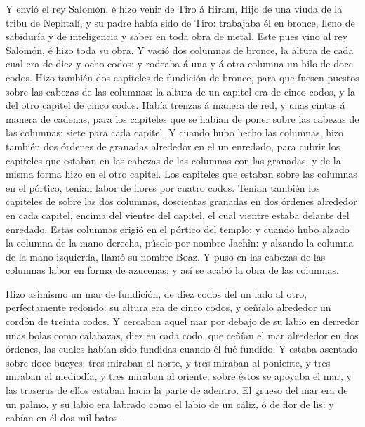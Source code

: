  Y envió el rey Salomón, é hizo venir de Tiro á Hiram,
 Hijo de una viuda de la tribu de Nephtalí, y su padre
había sido de Tiro: trabajaba él en bronce, lleno de sabiduría y de
inteligencia y saber en toda obra de metal. Este pues vino al rey
Salomón, é hizo toda su obra.  Y vació dos columnas de
bronce, la altura de cada cual era de diez y ocho codos: y rodeaba á una
y á otra columna un hilo de doce codos.  Hizo también dos
capiteles de fundición de bronce, para que fuesen puestos sobre las
cabezas de las columnas: la altura de un capitel era de cinco codos, y
la del otro capitel de cinco codos.  Había trenzas á manera
de red, y unas cintas á manera de cadenas, para los capiteles que se
habían de poner sobre las cabezas de las columnas: siete para cada
capitel.  Y cuando hubo hecho las columnas, hizo también
dos órdenes de granadas alrededor en el un enredado, para cubrir los
capiteles que estaban en las cabezas de las columnas con las granadas: y
de la misma forma hizo en el otro capitel.  Los capiteles
que estaban sobre las columnas en el pórtico, tenían labor de flores por
cuatro codos.  Tenían también los capiteles de sobre las
dos columnas, doscientas granadas en dos órdenes alrededor en cada
capitel, encima del vientre del capitel, el cual vientre estaba delante
del enredado.  Estas columnas erigió en el pórtico del
templo: y cuando hubo alzado la columna de la mano derecha, púsole por
nombre Jachîn: y alzando la columna de la mano izquierda, llamó su
nombre Boaz.  Y puso en las cabezas de las columnas labor
en forma de azucenas; y así se acabó la obra de las columnas.

 Hizo asimismo un mar de fundición, de diez codos del un
lado al otro, perfectamente redondo: su altura era de cinco codos, y
ceñíalo alrededor un cordón de treinta codos.  Y cercaban
aquel mar por debajo de su labio en derredor unas bolas como calabazas,
diez en cada codo, que ceñían el mar alrededor en dos órdenes, las
cuales habían sido fundidas cuando él fué fundido.  Y
estaba asentado sobre doce bueyes: tres miraban al norte, y tres miraban
al poniente, y tres miraban al mediodía, y tres miraban al oriente;
sobre éstos se apoyaba el mar, y las traseras de ellos estaban hacia la
parte de adentro.  El grueso del mar era de un palmo, y su
labio era labrado como el labio de un cáliz, ó de flor de lis: y cabían
en él dos mil batos.

